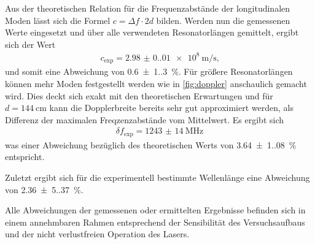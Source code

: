 Aus der theoretischen Relation für die Frequenzabstände der longitudinalen Moden lässt sich die Formel $c=\Delta f \cdot 2d$ bilden. Werden nun die gemessenen Werte eingesetzt und über alle verwendeten Resonatorlängen gemittelt, ergibt sich der Wert
\begin{align}
    c_\text{exp}=\SI{2.98(0.01)e8}{\meter\per\second}\text{,}
\end{align}
und somit eine Abweichung von \SI{0.6(1.3)}{\percent}.
Für größere Resonatorlängen können mehr Moden festgestellt werden wie in \autoref{fig:doppler} anschaulich gemacht wird. Dies deckt sich exakt mit den theoretischen Erwartungen und für $d=\SI{144}{\centi\meter}$ kann die Dopplerbreite bereits sehr gut approximiert werden, als Differenz der maximalen Freqzenzabstände vom Mittelwert. Es ergibt sich
\begin{align}
    \delta f_\text{exp}=\SI{1243(14)}{\mega\hertz}
\end{align}
was einer Abweichung bezüglich des theoretischen Werts von \SI{3.64(1.08)}{\percent} entspricht.

Zuletzt ergibt sich für die experimentell bestimmte Wellenlänge eine Abweichung von \SI{2.36(5.37)}{\percent}.

Alle Abweichungen der gemessenen oder ermittelten Ergebnisse befinden sich in einem annehmbaren Rahmen entsprechend der Sensibilität des Versuchsaufbaus und der nicht verlustfreien Operation des Lasers.
